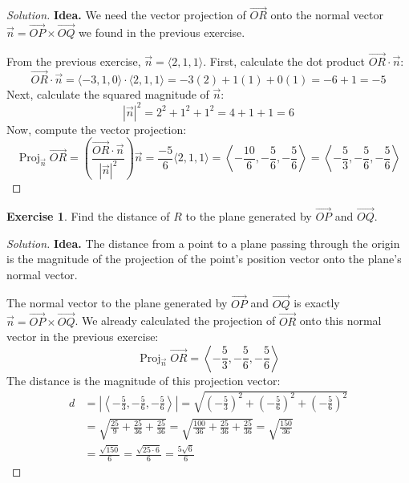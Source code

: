 \documentclass[11pt]{article}
\theoremstyle{definition}
\newtheorem{exercise}{Exercise}[section]
\newenvironment{solution}{\begin{proof}[Solution]}{\end{proof}}
\begin{document}
\begin{solution}
\textbf{Idea.} We need the vector projection of $\vec{OR}$ onto the normal vector $\vec{n} = \vec{OP} \times \vec{OQ}$ we found in the previous exercise.

From the previous exercise, $\vec{n} = \langle 2, 1, 1 \rangle$.
First, calculate the dot product $\vec{OR} \cdot \vec{n}$:
\[ \vec{OR} \cdot \vec{n} = \langle -3, 1, 0 \rangle \cdot \langle 2, 1, 1 \rangle = -3(2) + 1(1) + 0(1) = -6 + 1 = -5 \]
Next, calculate the squared magnitude of $\vec{n}$:
\[ |\vec{n}|^2 = 2^2 + 1^2 + 1^2 = 4 + 1 + 1 = 6 \]
Now, compute the vector projection:
\[ \operatorname{Proj}_{\vec{n}} \vec{OR} = \left( \frac{\vec{OR} \cdot \vec{n}}{|\vec{n}|^2} \right) \vec{n} = \frac{-5}{6} \langle 2, 1, 1 \rangle = \left\langle -\frac{10}{6}, -\frac{5}{6}, -\frac{5}{6} \right\rangle = \left\langle -\frac{5}{3}, -\frac{5}{6}, -\frac{5}{6} \right\rangle \]
\end{solution}

\begin{exercise}
Find the distance of $R$ to the plane generated by $\vec{OP}$ and $\vec{OQ}$.
\end{exercise}

\begin{solution}
\textbf{Idea.} The distance from a point to a plane passing through the origin is the magnitude of the projection of the point's position vector onto the plane's normal vector.

The normal vector to the plane generated by $\vec{OP}$ and $\vec{OQ}$ is exactly $\vec{n} = \vec{OP} \times \vec{OQ}$.
We already calculated the projection of $\vec{OR}$ onto this normal vector in the previous exercise:
\[ \operatorname{Proj}_{\vec{n}} \vec{OR} = \left\langle -\frac{5}{3}, -\frac{5}{6}, -\frac{5}{6} \right\rangle \]
The distance is the magnitude of this projection vector:
\begin{align*}
d &= \left| \left\langle -\frac{5}{3}, -\frac{5}{6}, -\frac{5}{6} \right\rangle \right| = \sqrt{ \left(-\frac{5}{3}\right)^2 + \left(-\frac{5}{6}\right)^2 + \left(-\frac{5}{6}\right)^2 } \\
&= \sqrt{ \frac{25}{9} + \frac{25}{36} + \frac{25}{36} } = \sqrt{ \frac{100}{36} + \frac{25}{36} + \frac{25}{36} } = \sqrt{ \frac{150}{36} } \\
&= \frac{\sqrt{150}}{6} = \frac{\sqrt{25 \cdot 6}}{6} = \frac{5\sqrt{6}}{6}
\end{align*}
\end{solution}
\end{document}
